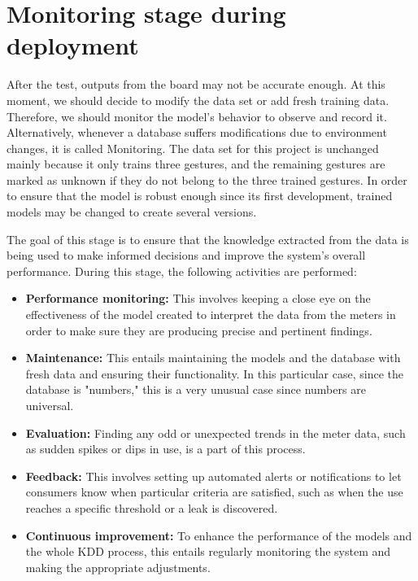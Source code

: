 		\section{Monitoring stage during deployment}
		After the test, outputs from the board may not be accurate enough. At this moment, we should decide to modify the data set or add fresh training data. Therefore, we should monitor the model’s behavior to observe and record it. Alternatively, whenever a database suffers modifications due to environment changes, it is called Monitoring. The data set for this project is unchanged mainly because it only trains three gestures, and the remaining gestures are marked as unknown if they do not belong to the three trained gestures. In order to ensure that the model is robust enough since its first development, trained models may be changed to create several versions.
		
		The goal of this stage is to ensure that the knowledge extracted from the data is being used to make informed decisions and improve the system's overall performance. During this stage, the following activities are performed:
		
		\begin{itemize}
			\item \textbf{Performance monitoring:} This involves keeping a close eye on the effectiveness of the model created to interpret the data from the meters in order to make sure they are producing precise and pertinent findings.
			\item \textbf{Maintenance:} This entails maintaining the models and the database with fresh data and ensuring their functionality. In this particular case, since the database is "numbers," this is a very unusual case since numbers are universal.
			\item \textbf{Evaluation:} Finding any odd or unexpected trends in the meter data, such as	sudden spikes or dips in use, is a part of this process.
			\item \textbf{Feedback:} This involves setting up automated alerts or notifications to let consumers know when particular criteria are satisfied, such as when the use reaches a specific threshold or a leak is discovered.
			\item \textbf{Continuous improvement:} To enhance the performance of the models and the whole KDD process, this entails regularly monitoring the system and making the appropriate adjustments.
		\end{itemize}
		
